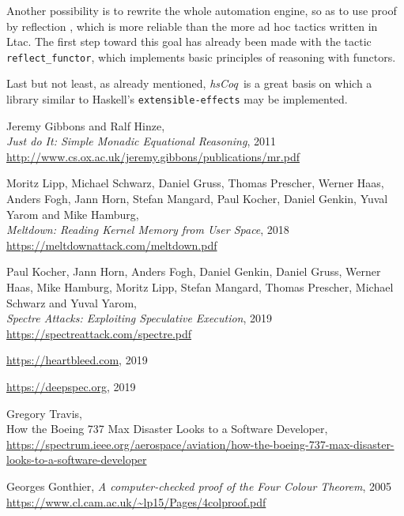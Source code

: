 \documentclass[declaration,inz,english,shortabstract]{iithesis}
\newcommand{\libname}{\textit{hsCoq}}
\newcommand{\m}[1]{\texttt{#1}}
\begin{document}
Another possibility is to rewrite the whole automation engine, so as to use proof by reflection \cite{CPDT}, which is more reliable than the more ad hoc tactics written in Ltac. The first step toward this goal has already been made with the tactic \m{reflect\_functor}, which implements basic principles of reasoning with functors.

Last but not least, as already mentioned, \libname\ is a great basis on which a library similar to Haskell's \m{extensible-effects} may be implemented.


\begin{thebibliography}{1}

        Jeremy Gibbons and Ralf Hinze, \\
        \textit{Just do It: Simple Monadic Equational Reasoning}, 2011 \\
        \url{http://www.cs.ox.ac.uk/jeremy.gibbons/publications/mr.pdf}

        Moritz Lipp, Michael Schwarz, Daniel Gruss, Thomas Prescher, Werner Haas, Anders Fogh, Jann Horn, Stefan Mangard, Paul Kocher, Daniel Genkin, Yuval Yarom and Mike Hamburg, \\
        \textit{Meltdown: Reading Kernel Memory from User Space}, 2018 \\
        \url{https://meltdownattack.com/meltdown.pdf}

        Paul Kocher, Jann Horn, Anders Fogh, Daniel Genkin, Daniel Gruss, Werner Haas, Mike Hamburg, Moritz Lipp, Stefan Mangard, Thomas Prescher, Michael Schwarz and Yuval Yarom, \\
        \textit{Spectre Attacks: Exploiting Speculative Execution}, 2019 \\
        \url{https://spectreattack.com/spectre.pdf}
    
        \url{https://heartbleed.com},
        2019

        \url{https://deepspec.org},
        2019

        Gregory Travis, \\
        How the Boeing 737 Max Disaster Looks to a Software Developer, \\
        \url{https://spectrum.ieee.org/aerospace/aviation/how-the-boeing-737-max-disaster-looks-to-a-software-developer}
    
        Georges Gonthier,
        \textit{A computer-checked proof of the Four Colour Theorem}, 2005 \\
        \url{https://www.cl.cam.ac.uk/~lp15/Pages/4colproof.pdf}
    

\end{thebibliography}
\end{document}
